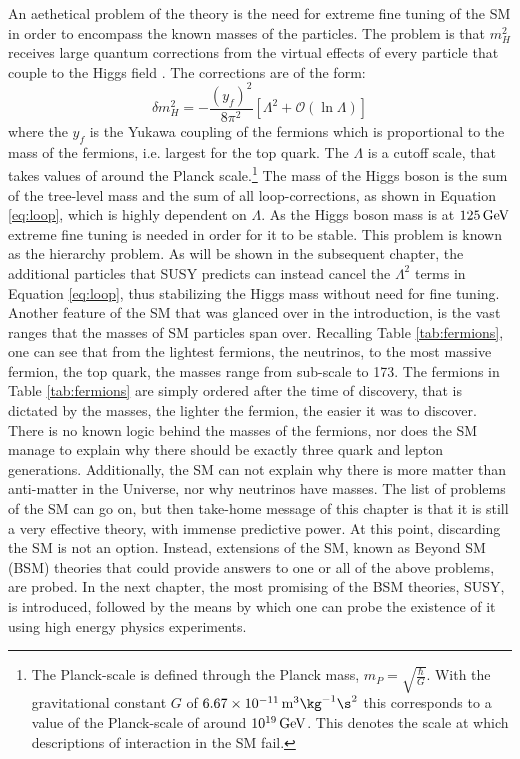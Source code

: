 \newpara
\noindent\justify
An aethetical problem of the theory is the need for extreme fine tuning of the SM in order to encompass the known masses of the particles. 
The problem is that $m_{H}^{2}$ receives large quantum corrections from the virtual effects of every particle that couple to the Higgs field \cite{Martin:1997ns}. 
The corrections are of the form:
\begin{equation}
\delta m_{H}^{2}=-\frac{(y_{f})^{2}}{8\pi^{2}}\left[ \Lambda^{2} + \mathcal{O}\left(\ln\Lambda\right)\right] 
\label{eq:loop}
\end{equation}
where the $y_{f}$ is the Yukawa coupling of the fermions which is proportional to the mass of the fermions, i.e. largest for the top quark. 
The $\Lambda$ is a cutoff scale, that takes values of around the Planck scale.\footnote{The Planck-scale is defined through the Planck mass, $m_{P}=\sqrt{\frac{\hbar}{G}}$. With the gravitational constant $G$ of $6.67\times10^{-11}\m^{3}\kg^{-1}\s^{2}$ this corresponds to a value of the Planck-scale of around $10^{19}\,\text{Ge\hspace{-.08em}V}$. This denotes the scale at which descriptions of interaction in the SM fail.} 
The mass of the Higgs boson is the sum of the tree-level mass and the sum of all loop-corrections, as shown in Equation \ref{eq:loop}, which is highly dependent on $\Lambda$. 
As the Higgs boson mass is at $125\,\text{Ge\hspace{-.08em}V}$ extreme fine tuning is needed in order for it to be stable. 
This problem is known as the hierarchy problem. 
As will be shown in the subsequent chapter, the additional particles that SUSY predicts can instead cancel the $\Lambda^{2}$ terms in Equation \ref{eq:loop}, thus stabilizing the Higgs mass without need for fine tuning.
\newpara
\noindent\justify
Another feature of the SM that was glanced over in the introduction, is the vast ranges that the masses of SM particles span over. 
Recalling Table \ref{tab:fermions}, one can see that from the lightest fermions, the neutrinos, to the most massive fermion, the top quark, the masses range from sub-\eV scale to 173\GeV.
The fermions in Table \ref{tab:fermions} are simply ordered after the time of discovery, that is dictated by the masses, the lighter the fermion, the easier it was to discover. 
There is no known logic behind the masses of the fermions, nor does the SM manage to explain why there should be exactly three quark and lepton generations. 
Additionally, the SM can not explain why there is more matter than anti-matter in the Universe, nor why neutrinos have masses. 
The list of problems of the SM can go on, but then take-home message of this chapter is that it is still a very effective theory, with immense predictive power. 
At this point, discarding the SM is not an option. 
Instead, extensions of the SM, known as Beyond SM (BSM) theories that could provide answers to one or all of the above problems, are probed. 
In the next chapter, the most promising of the BSM theories, SUSY, is introduced, followed by the means by which one can probe the existence of it using high energy physics experiments.  
